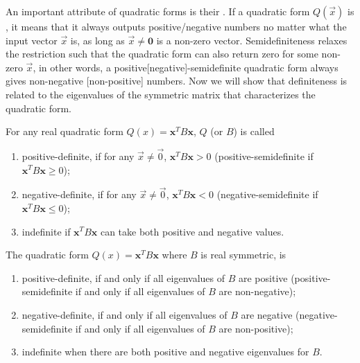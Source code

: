 An important attribute of quadratic forms is their . If a quadratic form $Q(\vec{x})$ is , it means that it always outputs positive/negative numbers no matter what the input vector $\vec{x}$ is, as long as $\vec{x} \neq \textbf{0}$ is a non-zero vector. Semidefiniteness relaxes the restriction such that the quadratic form can also return zero for some non-zero $\vec{x}$, in other words, a positive[negative]-semidefinite quadratic form always gives non-negative [non-positive] numbers. Now we will show that definiteness is related to the eigenvalues of the symmetric matrix that characterizes the quadratic form.
\begin{defn}
\label{defn:quaddefinite}
For any real quadratic form $Q(x) = \textbf{x}^T B\textbf{x}$, $Q$ (or $B$) is called
\begin{enumerate}[label=(\alph*)]
\item positive-definite, if for any $\vec{x} \neq \vec{0}$, $\textbf{x}^T B\textbf{x} > 0$ (positive-semidefinite if $\textbf{x}^T B\textbf{x} \geq 0$);
\item negative-definite, if for any $\vec{x} \neq \vec{0}$, $\textbf{x}^T B\textbf{x} < 0$ (negative-semidefinite if $\textbf{x}^T B\textbf{x} \leq 0$); 
\item indefinite if $\textbf{x}^T B\textbf{x}$ can take both positive and negative values.
\end{enumerate}
\end{defn}
\begin{thm}
\label{thm:quaddefinite}
The quadratic form $Q(x) = \textbf{x}^T B\textbf{x}$ where $B$ is real symmetric, is
\begin{enumerate}[label=(\alph*)]
\item positive-definite, if and only if all eigenvalues of $B$ are positive (positive-semidefinite if and only if all eigenvalues of $B$ are non-negative);
\item negative-definite, if and only if all eigenvalues of $B$ are negative (negative-semidefinite if and only if all eigenvalues of $B$ are non-positive); 
\item indefinite when there are both positive and negative eigenvalues for $B$.
\end{enumerate}
\end{thm}
